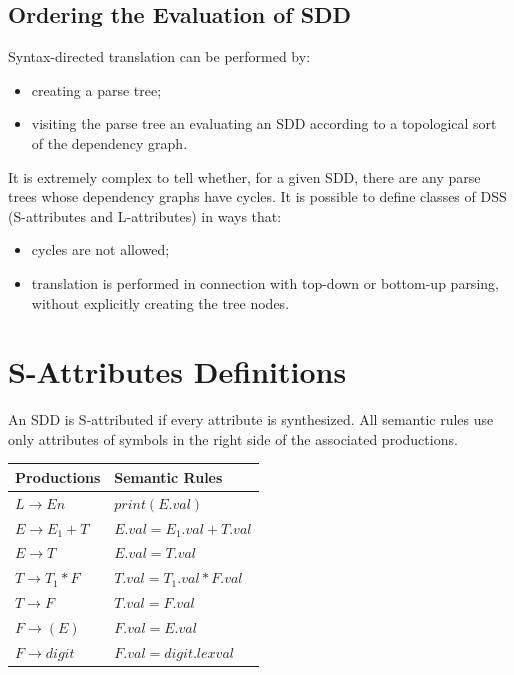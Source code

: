 \subsection{Ordering the Evaluation of SDD}
Syntax-directed translation can be performed by:
\begin{itemize}
    \item creating a parse tree;
    \item visiting the parse tree an evaluating an SDD according to a topological sort of the dependency graph.
\end{itemize}
It is extremely complex to tell whether, for a given SDD, there are any parse trees whose dependency graphs have cycles.
It is possible to define classes of DSS (S-attributes and L-attributes) in ways that:
\begin{itemize}
    \item cycles are not allowed;
    \item translation is performed in connection with top-down or bottom-up parsing, without explicitly creating the tree nodes.
\end{itemize}

\section{S-Attributes Definitions}
An SDD is S-attributed if every attribute is synthesized.
All semantic rules use only attributes of symbols in the right side of the associated productions.

\begin{table}[h]
    \centering
    \begin{tabular}{l|l}
        Productions & Semantic Rules \\ \hline
        $L \to En$ & $print(E.val)$ \\ \hline
        $E \to E_1 + T$ & $E.val = E_1.val + T.val$ \\ \hline
        $E \to T$ & $E.val = T.val$ \\ \hline
        $T \to T_1 \ast F$ & $T.val = T_1.val \ast F.val$ \\ \hline
        $T \to F$ & $T.val = F.val$ \\ \hline
        $F \to (E)$ & $F.val = E.val$ \\ \hline
        $F \to digit$ & $F.val = digit.lexval$ 
    \end{tabular}
\end{table}

